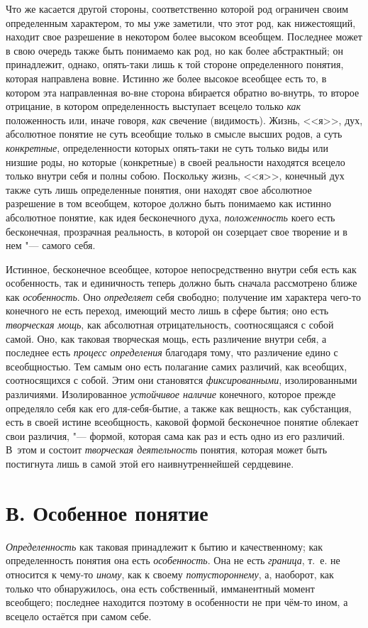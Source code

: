 Что же касается другой стороны, соответственно которой род
ограничен своим определенным характером, то мы уже заметили, что
этот род, как нижестоящий, находит свое разрешение в
некотором более высоком всеобщем. Последнее может в свою очередь также быть
понимаемо как род, но как более абстрактный; он принадлежит, однако,
опять-таки лишь к той стороне определенного понятия, которая направлена
вовне. Истинно же более высокое всеобщее есть то, в котором эта
направленная во-вне сторона вбирается обратно во-внутрь, то второе
отрицание, в котором определенность выступает всецело только
{\em как} положенность
или, иначе говоря, {\em как}
свечение (видимость). Жизнь, <<я>>, дух, абсолютное понятие не
суть всеобщие только в смысле высших родов, а суть
{\em конкретные},
определенности которых опять-таки не суть только виды или
низшие роды, но которые (конкретные) в своей реальности находятся всецело
только внутри себя и полны собою. Поскольку жизнь, <<я>>, конечный дух также
суть лишь определенные понятия, они находят свое абсолютное разрешение в
том всеобщем, которое должно быть понимаемо как истинно абсолютное понятие,
как идея бесконечного духа,
{\em положенность} коего
есть бесконечная, прозрачная реальность, в которой он созерцает свое
творение и в нем "--- самого себя.

Истинное, бесконечное всеобщее, которое непосредственно внутри
себя есть как особенность, так и единичность теперь должно быть сначала
рассмотрено ближе как
{\em особенность}. Оно
{\em определяет} себя
свободно; получение им характера чего-то конечного не есть переход, имеющий
место лишь в сфере бытия; оно есть
{\em творческая мощь},
как абсолютная отрицательность, соотносящаяся с собой самой.
Оно, как таковая творческая мощь, есть различение внутри себя, а последнее
есть {\em процесс определения}
благодаря тому, что различение едино с всеобщностью. Тем
самым оно есть полагание самих различий, как всеобщих, соотносящихся с
собой. Этим они становятся
{\em фиксированными},
изолированными различиями. Изолированное
{\em устойчивое наличие}
конечного, которое прежде определяло себя как его
для-себя-бытие, а также как вещность, как субстанция, есть в своей истине
всеобщность, каковой формой бесконечное понятие облекает свои различия, "---
формой, которая сама как раз и есть одно из его различий.
В~этом и состоит {\em творческая
деятельность} понятия, которая может быть постигнута лишь в
самой этой его наивнутреннейшей сердцевине.

\section[В. Особенное понятие]{В. Особенное понятие}
{\em Определенность} как
таковая принадлежит к бытию и качественному; как определенность понятия она
есть {\em особенность}.
Она не есть
{\em граница}, т.~е. не
относится к чему-то {\em иному},
как к своему
{\em потустороннему}, а,
наоборот, как только что обнаружилось, она есть собственный, имманентный
момент всеобщего; последнее находится поэтому в особенности не
при чём-то ином, а всецело остаётся при самом себе.

